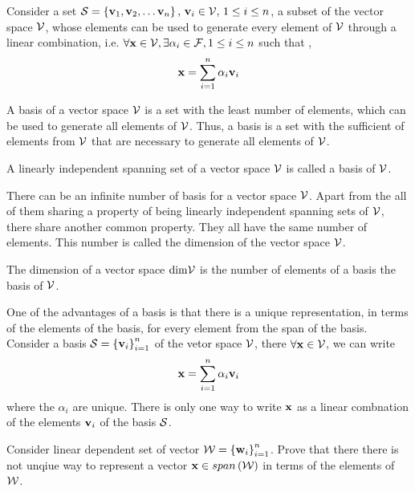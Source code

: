 Consider a set $\mathcal{S} = \left\{ \mathbf{v}_1, \mathbf{v}_2, \ldots \mathbf{v}_n\right\}, \, \mathbf{v}_i \in \mathcal{V}, \, 1 \leq i \leq n$, a subset of the vector space $\mathcal{V}$, whose elements can be used to generate every element of $\mathcal{V}$ through a linear combination, i.e. $\forall \mathbf{x} \in \mathcal{V}, \exists \alpha_i \in \mathcal{F}, 1 \leq i \leq n$ such that , 
\[ \mathbf{x} = \sum_{i=1}^n\alpha_i \mathbf{v}_i \]

A basis of a vector space $\mathcal{V}$ is a set with the least number of elements, which can be used to generate all elements of $\mathcal{V}$. Thus, a basis is a set with the sufficient of elements from $\mathcal{V}$ that are necessary to generate all elements of $\mathcal{V}$. 

\begin{definition}[frametitle=Basis of a vector space]
A linearly independent spanning set of a vector space $\mathcal{V}$ is called a basis of $\mathcal{V}$.
\end{definition}

There can be an infinite number of basis for a vector space $\mathcal{V}$. Apart from the all of them sharing a property of being linearly independent spanning sets of $\mathcal{V}$, there share another common property. They all have the same number of elements. This number is called the dimension of the vector space $\mathcal{V}$.

\begin{definition}[frametitle=Dimension of a vector space]
The dimension of a vector space $\text{dim} \mathcal{V}$ is the number of elements of a basis the basis of $\mathcal{V}$.
\end{definition} 

One of the advantages of a basis is that there is a unique representation, in terms of the elements of the basis, for every element from the span of the basis. Consider a basis $\mathcal{S} = \left\{ \mathbf{v}_i \right\}_{i=1}^n$ of the vetor space $\mathcal{V}$, there $\forall \mathbf{x} \in \mathcal{V}$, we can write 
\[ \mathbf{x} = \sum_{i=1}^n \alpha_i\mathbf{v}_i \]
where the $\alpha_i$ are unique. There is only one way to write $\mathbf{x}$ as a linear combnation of the elements $\mathbf{v}_i$ of the basis $\mathcal{S}$.

\begin{problem*}[frametitle=Basis and representation of vectors]
Consider linear dependent set of vector $\mathcal{W} = \left\{ \mathbf{w}_i \right\}_{i=1}^n$. Prove that there there is not unqiue way to represent a vector $\mathbf{x} \in span\left( \mathcal{W} \right)$ in terms of the elements of $\mathcal{W}$.
\end{problem*}

